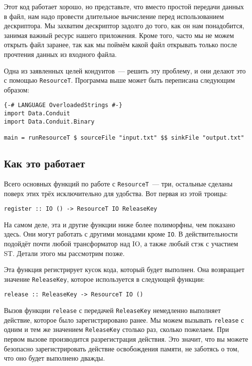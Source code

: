 Этот код работает хорошо, но представьте, что вместо простой передачи данных в файл, нам
надо провести длительное вычисление перед использованием дескриптора. Мы захватим
дескриптор задолго до того, как он нам понадобится, занимая важный ресурс нашего
приложения. Кроме того, часто мы не можем открыть файл заранее, так как мы поймём какой файл
открывать только после прочтения данных из входного файла.

Одна из заявленных целей кондуитов~--- решить эту проблему, и они делают это с помощью \lstinline'ResourceT'.
Программа выше может быть переписана следующим образом:
\begin{lstlisting}
{-# LANGUAGE OverloadedStrings #-}
import Data.Conduit
import Data.Conduit.Binary

main = runResourceT $ sourceFile "input.txt" $$ sinkFile "output.txt"
\end{lstlisting}

\subsection{Как это работает}
Всего основных функций по работе с \lstinline'ResourceT'~--- три, остальные
сделаны поверх этих трёх исключительно для удобства. Вот первая из этой троицы:
\begin{lstlisting}
register :: IO () -> ResourceT IO ReleaseKey
\end{lstlisting}

\begin{remark}
На самом деле, эта и другие функции ниже более полиморфны, чем показано здесь. Они могут работать с другими монадами кроме \lstinline'IO'. В действительности подойдёт почти любой трансформатор над
IO, а также любый стэк с участием ST. Детали этого мы рассмотрим позже.
\end{remark}

Эта функция регистрирует кусок кода, который будет выполнен. Она
возвращает значение \lstinline'ReleaseKey', которое используется в следующей функции:

\begin{lstlisting}
release :: ReleaseKey -> ResourceT IO ()
\end{lstlisting}
Вызов функции \lstinline!release! с передачей \lstinline!ReleaseKey! немедленно выполняет действие, которое было
зарегистрировано ранее. Мы можем вызывать \lstinline!release! с одним и тем же значением
\lstinline'ReleaseKey'
столько раз, сколько пожелаем. При первом вызове производится разрегистрация действия. Это
значит, что вы можете безопасно зарегистрировать действие освобождения памяти, не
заботясь о том, что оно будет выполнено дважды.

